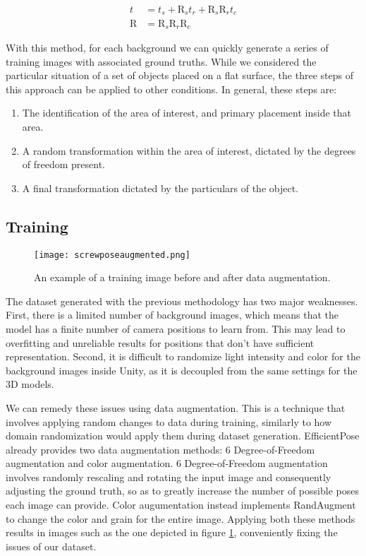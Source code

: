 \begin{align*}
    t &= t_s + \text{R}_s t_r + \text{R}_s \text{R}_r t_c\\
    \text{R} &= \text{R}_s \text{R}_r \text{R}_c
\end{align*}

With this method, for each background we can quickly generate a series of training images with associated ground truths. While we considered the particular situation of a set of objects placed on a flat surface, the three steps of this approach can be applied to other conditions. In general, these steps are:

\begin{enumerate}
    \item The identification of the area of interest, and primary placement inside that area.
    \item A random transformation within the area of interest, dictated by the degrees of freedom present.
    \item A final transformation dictated by the particulars of the object.
\end{enumerate}

\subsection{Training}

\begin{figure}[ht]
    \texttt{[image: screwposeaugmented.png]}
    \caption{An example of a training image before and after data augmentation.}
    \label{fig:ScrewPoseAugmented}
\end{figure}

The dataset generated with the previous methodology has two major weaknesses. First, there is a limited number of background images, which means that the model has a finite number of camera positions to learn from. This may lead to overfitting and unreliable results for positions that don't have sufficient representation. Second, it is difficult to randomize light intensity and color for the background images inside Unity, as it is decoupled from the same settings for the 3D models.

We can remedy these issues using data augmentation. This is a technique that involves applying random changes to data during training, similarly to how domain randomization would apply them during dataset generation. EfficientPose already provides two data augmentation methods: 6 Degree-of-Freedom augmentation and color augmentation. 6 Degree-of-Freedom augmentation involves randomly rescaling and rotating the input image and consequently adjusting the ground truth, so as to greatly increase the number of possible poses each image can provide. Color augumentation instead implements RandAugment\cite{RandAugment} to change the color and grain for the entire image. Applying both these methods results in images such as the one depicted in figure \ref{fig:ScrewPoseAugmented}, conveniently fixing the issues of our dataset.

